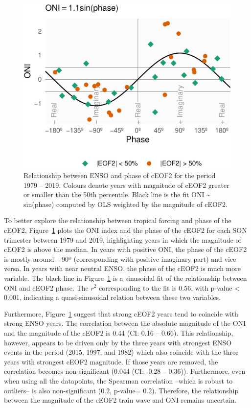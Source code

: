 \documentclass[smallextended]{svjour3}       %
\begin{document}
\begin{figure}
\centering
\includegraphics{../figures/enso-phase-1.pdf}
\caption{\label{fig:enso-phase}Relationship between ENSO and phase of cEOF2 for the period 1979 -- 2019. Colours denote years with magnitude of cEOF2 greater or smaller than the 50th percentile. Black line is the fit ONI \textasciitilde{} sin(phase) computed by OLS weighted by the magnitude of cEOF2.}
\end{figure}

To better explore the relationship between tropical forcing and phase of the cEOF2, Figure~\ref{fig:enso-phase} plots the ONI index and the phase of the cEOF2 for each SON trimester between 1979 and 2019, highlighting years in which the magnitude of cEOF2 is above the median. In years with positive ONI, the phase of the cEOF2 is mostly around +90º (corresponding with positive imaginary part) and vice versa. In years with near neutral ENSO, the phase of the cEOF2 is much more variable. The black line in Figure~\ref{fig:enso-phase} is a sinusoidal fit of the relationship between ONI and cEOF2 phase. The \(r^2\) corresponding to the fit is 0.56, with p-value \textless{} 0.001, indicating a quasi-sinusoidal relation between these two variables.

Furthermore, Figure~\ref{fig:enso-phase} suggest that strong cEOF2 years tend to coincide with strong ENSO years. The correlation between the absolute magnitude of the ONI and the magnitude of the cEOF2 is 0.44 (CI: 0.16 -- 0.66). This relationship, however, appears to be driven only by the three years with strongest ENSO events in the period (2015, 1997, and 1982) which also coincide with the three years with strongest cEOF2 magnitude. If those years are removed, the correlation becomes non-significant (0.044 (CI: -0.28 -- 0.36)). Furthermore, even when using all the datapoints, the Spearman correlation --which is robust to outliers-- is also non-significant (0.2, p-value= 0.2). Therefore, the relationship between the magnitude of the cEOF2 train wave and ONI remains uncertain.
\end{document}
